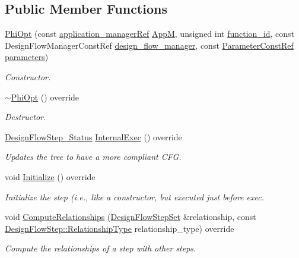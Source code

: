 \subsection*{Public Member Functions}
\begin{DoxyCompactItemize}
\item 
\hyperlink{classPhiOpt_aacf9802f665e61f3de0790b306667c2b}{Phi\+Opt} (const \hyperlink{application__manager_8hpp_a04ccad4e5ee401e8934306672082c180}{application\+\_\+manager\+Ref} \hyperlink{classFrontendFlowStep_a0ac0d8db2a378416583f51c4faa59d15}{AppM}, unsigned int \hyperlink{classFunctionFrontendFlowStep_a58ef2383ad1a212a8d3f396625a4b616}{function\+\_\+id}, const Design\+Flow\+Manager\+Const\+Ref \hyperlink{classDesignFlowStep_ab770677ddf087613add30024e16a5554}{design\+\_\+flow\+\_\+manager}, const \hyperlink{Parameter_8hpp_a37841774a6fcb479b597fdf8955eb4ea}{Parameter\+Const\+Ref} \hyperlink{classDesignFlowStep_a802eaafe8013df706370679d1a436949}{parameters})
\begin{DoxyCompactList}\small\item\em Constructor. \end{DoxyCompactList}\item 
\hyperlink{classPhiOpt_ab5e673afa29877e20a18490e4193a9d4}{$\sim$\+Phi\+Opt} () override
\begin{DoxyCompactList}\small\item\em Destructor. \end{DoxyCompactList}\item 
\hyperlink{design__flow__step_8hpp_afb1f0d73069c26076b8d31dbc8ebecdf}{Design\+Flow\+Step\+\_\+\+Status} \hyperlink{classPhiOpt_aad12a9928fb1f1b7a28777c4480a31f4}{Internal\+Exec} () override
\begin{DoxyCompactList}\small\item\em Updates the tree to have a more compliant C\+FG. \end{DoxyCompactList}\item 
void \hyperlink{classPhiOpt_a1b620dd1d02ad1accbfe986e02add067}{Initialize} () override
\begin{DoxyCompactList}\small\item\em Initialize the step (i.\+e., like a constructor, but executed just before exec. \end{DoxyCompactList}\item 
void \hyperlink{classPhiOpt_ae9fa634dbb3dfb91ff7928cc8e48be1c}{Compute\+Relationships} (\hyperlink{classDesignFlowStepSet}{Design\+Flow\+Step\+Set} \&relationship, const \hyperlink{classDesignFlowStep_a723a3baf19ff2ceb77bc13e099d0b1b7}{Design\+Flow\+Step\+::\+Relationship\+Type} relationship\+\_\+type) override
\begin{DoxyCompactList}\small\item\em Compute the relationships of a step with other steps. \end{DoxyCompactList}\end{DoxyCompactItemize}
